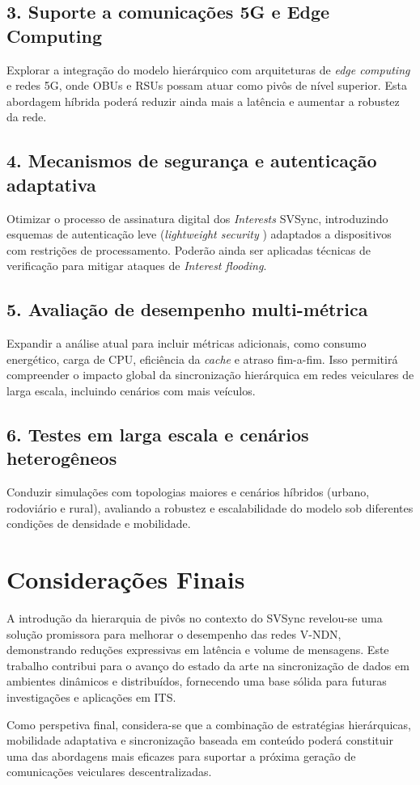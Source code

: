 \subsection*{3. Suporte a comunicações 5G e Edge Computing}
Explorar a integração do modelo hierárquico com arquiteturas de \textit{edge computing} e redes 5G, onde \gls{OBUs} e \gls{RSUs} possam atuar como pivôs de nível superior. Esta abordagem híbrida poderá reduzir ainda mais a latência e aumentar a robustez da rede.

\subsection*{4. Mecanismos de segurança e autenticação adaptativa}
Otimizar o processo de assinatura digital dos \textit{Interests} \gls{SVSync}, introduzindo esquemas de autenticação leve (\textit{lightweight security} \cite{maharshi_dayanand_university_rohtak_haryana_india_lightweight_2019}) adaptados a dispositivos com restrições de processamento. Poderão ainda ser aplicadas técnicas de verificação para mitigar ataques de \textit{Interest flooding}.

\subsection*{5. Avaliação de desempenho multi-métrica}
Expandir a análise atual para incluir métricas adicionais, como consumo energético, carga de CPU, eficiência da \textit{cache} e atraso fim-a-fim. Isso permitirá compreender o impacto global da sincronização hierárquica em redes veiculares de larga escala, incluindo cenários com mais veículos.

\subsection*{6. Testes em larga escala e cenários heterogêneos}
Conduzir simulações com topologias maiores e cenários híbridos (urbano, rodoviário e rural), avaliando a robustez e escalabilidade do modelo sob diferentes condições de densidade e mobilidade.

\section{Considerações Finais}
A introdução da hierarquia de pivôs no contexto do \gls{SVSync} revelou-se uma solução promissora para melhorar o desempenho das redes \gls{V-NDN}, demonstrando reduções expressivas em latência e volume de mensagens. Este trabalho contribui para o avanço do estado da arte na sincronização de dados em ambientes dinâmicos e distribuídos, fornecendo uma base sólida para futuras investigações e aplicações em \gls{ITS}.

Como perspetiva final, considera-se que a combinação de estratégias hierárquicas, mobilidade adaptativa e sincronização baseada em conteúdo poderá constituir uma das abordagens mais eficazes para suportar a próxima geração de comunicações veiculares descentralizadas.